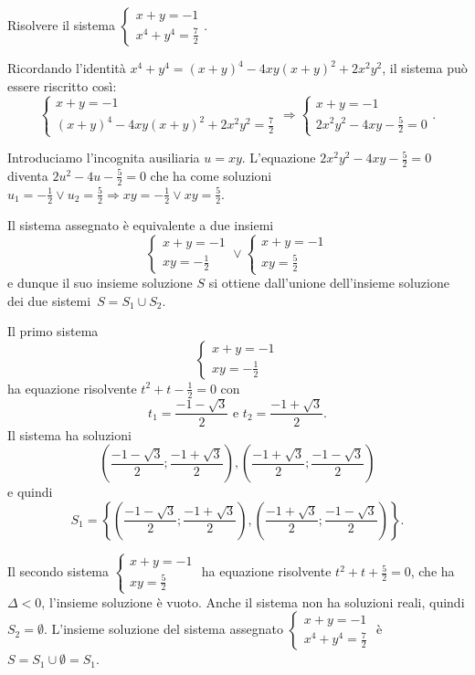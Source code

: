 \begin{esempio}{}{}
Risolvere il sistema \(\left\{\begin{array}{l}{x+y=-1}\\{x^4+y^4=\frac 7 
2}\end{array}\right.\).

Ricordando l'identità \(x^4+y^4=(x+y)^4-4{xy}(x+y)^2+2x^2y^2\), il sistema può 
essere riscritto così: 
\[\left\{\begin{array}{l}{x+y=-1}\\{(x+y)^4-4{xy}(x+y)^2+2x^2y^2=\frac 7 
2}\end{array}\right. \Rightarrow 
\left\{\begin{array}{l}{x+y=-1}\\{2x^2y^2-4{xy}-\frac 5 
2=0}\end{array}\right..\]

Introduciamo l'incognita ausiliaria \(u=xy\). L'equazione \(2x^2y^2-4{xy}-\frac 
5 2=0\) diventa \(2u^2-4u-\frac 5 2=0\) che ha come soluzioni \(u_1=-\frac 1 
2\vee u_2=\frac 5 2\Rightarrow {xy}=-\frac 1 2\vee {xy}=\frac 5 2\).

Il sistema assegnato è equivalente a due insiemi 
\[\left\{\begin{array}{l}{x+y=-1}\\{{xy}=-\frac 1 2}\end{array}\right.\vee 
\left\{\begin{array}{l}{x+y=-1}\\{{xy}=\frac 5 2}\end{array}\right.\] 
e dunque il suo insieme soluzione \(S\) si ottiene dall'unione dell'insieme 
soluzione dei due 
sistemi~\(S=S_1\cup S_2\).

Il primo sistema 
\[\left\{\begin{array}{l}{x+y=-1}\\{{xy}=-\frac 1 2}\end{array}\right.\] 
ha equazione risolvente \(t^2+t-\frac 1 2=0\) con 
\[t_1=\frac{-1-\sqrt 3} 2\text{ e }t_2=\frac{-1+\sqrt 3} 2.\] 
Il sistema ha soluzioni 
\[\left(\frac{-1-\sqrt 3} 2;\frac{-1+\sqrt 3} 2\right),\left(\frac{-1+\sqrt 3} 
2;\frac{-1-\sqrt 3} 2\right)\] e quindi \[S_1=\left\{\left(\frac{-1-\sqrt 3} 
2;\frac{-1+\sqrt 3} 2\right),\left(\frac{-1+\sqrt 3} 2;\frac{-1-\sqrt 3} 
2\right)\right\}.\]

Il secondo sistema \(\left\{\begin{array}{l}{x+y=-1}\\{{xy}=\frac 5 
2}\end{array}\right.\) ha equazione risolvente \(t^2+t+\frac 5 2=0\), che ha 
\(\Delta <0\), l'insieme soluzione è vuoto. Anche il sistema non ha soluzioni 
reali, quindi \(S_2=\emptyset \). L'insieme soluzione del sistema assegnato 
\(\left\{\begin{array}{l}{x+y=-1}\\{x^4+y^4=\frac 7 2}\end{array}\right.\) è 
\(S=S_1\cup \emptyset =S_1\).
\end{esempio}

